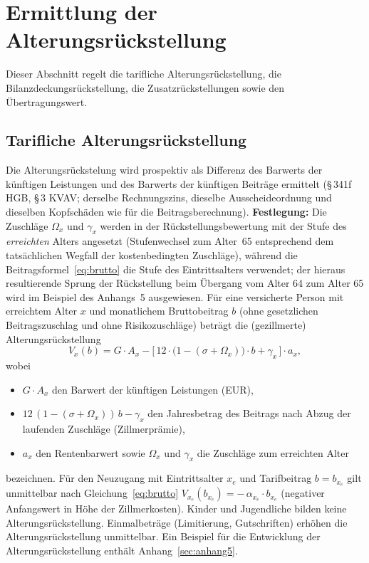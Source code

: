 \section{Ermittlung der Alterungsrückstellung}\label{sec:ar}

Dieser Abschnitt regelt die tarifliche Alterungsrückstellung, die
Bilanzdeckungsrückstellung, die Zusatzrückstellungen sowie den
Übertragungswert.

\subsection{Tarifliche Alterungsrückstellung}\label{sec:tarifar}

Die Alterungsrückstelung wird prospektiv als Differenz des Barwerts
der künftigen Leistungen und des Barwerts der künftigen Beiträge
ermittelt (\S\,341f HGB, \S\,3 KVAV; derselbe Rechnungszins, dieselbe
Ausscheideordnung und dieselben Kopfschäden wie für die
Beitragsberechnung). \textbf{Festlegung:} Die Zuschläge $\Omega_x$ und
$\gamma_x$ werden in der Rückstellungsbewertung mit der Stufe des
\emph{erreichten} Alters angesetzt (Stufenwechsel zum Alter~65
entsprechend dem tatsächlichen Wegfall der kostenbedingten Zuschläge),
während die Beitragsformel~\eqref{eq:brutto} die Stufe des
Eintrittsalters verwendet; der hieraus resultierende Sprung der
Rückstellung beim Übergang vom Alter 64 zum Alter 65 wird im Beispiel
des Anhangs~5 ausgewiesen. Für eine versicherte Person mit
erreichtem Alter $x$ und monatlichem Bruttobeitrag $b$ (ohne
gesetzlichen Beitragszuschlag und ohne Risikozuschläge) beträgt die
(gezillmerte) Alterungsrückstellung
\begin{equation}
V_x(b) = G\cdot A_x
- \bigl[\,12\cdot\bigl(1-(\sigma+\Omega_x)\bigr)\cdot b + \gamma_x\,\bigr]
\cdot a_x,
\label{eq:ar}
\end{equation}
wobei
\begin{itemize}\itemsep1pt
  \item $G\cdot A_x$ den Barwert der künftigen Leistungen (EUR),
  \item $12\,(1-(\sigma+\Omega_x))\,b - \gamma_x$ den Jahresbetrag des
        Beitrags nach Abzug der laufenden Zuschläge
        (\glqq Zillmerprämie\grqq),
  \item $a_x$ den Rentenbarwert sowie $\Omega_x$ und $\gamma_x$ die
        Zuschläge zum erreichten Alter
\end{itemize}
bezeichnen. Für den Neuzugang mit Eintrittsalter $x_e$ und
Tarifbeitrag $b = b_{x_e}$ gilt unmittelbar nach
Gleichung~\eqref{eq:brutto}
$V_{x_e}(b_{x_e}) = -\,\alpha_{x_e}\cdot b_{x_e}$ (negativer
Anfangswert in Höhe der Zillmerkosten). Kinder und Jugendliche bilden
keine Alterungsrückstellung. Einmalbeträge (Limitierung, Gutschriften)
erhöhen die Alterungsrückstellung unmittelbar. Ein Beispiel für die
Entwicklung der Alterungsrückstellung enthält Anhang~\ref{sec:anhang5}.

